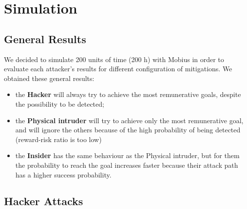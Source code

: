 %
\chapter{Simulation}\label{ch:simulation}
\section{General Results}
We decided to simulate 200 units of time (200 h) with Mobius in order to evaluate each attacker's results for 
different configuration of mitigations. We obtained these general results:\\
\begin{itemize}
    \item the \textbf{Hacker} will always try to achieve the most remunerative goals, despite the
        possibility to be detected; 
    \item the \textbf{Physical intruder} will try to achieve only the most remunerative goal, and will
        ignore the others because of the high probability of being detected (reward-risk ratio is too low)
    \item the \textbf{Insider} has the same behaviour as the Physical intruder, but for them the probability
        to reach the goal increases faster because their attack path has a higher success probability.
\end{itemize}
\newpage
\section{Hacker Attacks}

